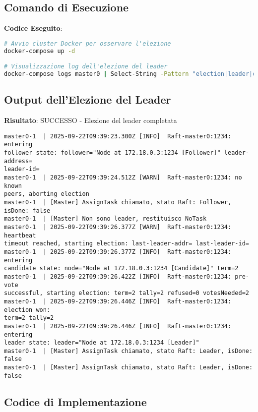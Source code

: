 \documentclass[12pt,a4paper]{article}
\begin{document}
\subsection{Comando di Esecuzione}

\textbf{Codice Eseguito}:
\begin{lstlisting}[language=bash]
# Avvio cluster Docker per osservare l'elezione
docker-compose up -d

# Visualizzazione log dell'elezione del leader
docker-compose logs master0 | Select-String -Pattern "election|leader|candidate|follower|term" | Select-Object -First 20
\end{lstlisting}

\subsection{Output dell'Elezione del Leader}

\textbf{Risultato}: SUCCESSO - Elezione del leader completata
\begin{lstlisting}
master0-1  | 2025-09-22T09:39:23.300Z [INFO]  Raft-master0:1234: entering 
follower state: follower="Node at 172.18.0.3:1234 [Follower]" leader-address=   
leader-id=
master0-1  | 2025-09-22T09:39:24.512Z [WARN]  Raft-master0:1234: no known       
peers, aborting election
master0-1  | [Master] AssignTask chiamato, stato Raft: Follower, isDone: false  
master0-1  | [Master] Non sono leader, restituisco NoTask
master0-1  | 2025-09-22T09:39:26.377Z [WARN]  Raft-master0:1234: heartbeat      
timeout reached, starting election: last-leader-addr= last-leader-id=
master0-1  | 2025-09-22T09:39:26.377Z [INFO]  Raft-master0:1234: entering       
candidate state: node="Node at 172.18.0.3:1234 [Candidate]" term=2
master0-1  | 2025-09-22T09:39:26.422Z [INFO]  Raft-master0:1234: pre-vote       
successful, starting election: term=2 tally=2 refused=0 votesNeeded=2
master0-1  | 2025-09-22T09:39:26.446Z [INFO]  Raft-master0:1234: election won: 
term=2 tally=2
master0-1  | 2025-09-22T09:39:26.446Z [INFO]  Raft-master0:1234: entering       
leader state: leader="Node at 172.18.0.3:1234 [Leader]"
master0-1  | [Master] AssignTask chiamato, stato Raft: Leader, isDone: false    
master0-1  | [Master] AssignTask chiamato, stato Raft: Leader, isDone: false    
\end{lstlisting}

\subsection{Codice di Implementazione}
\end{document}
